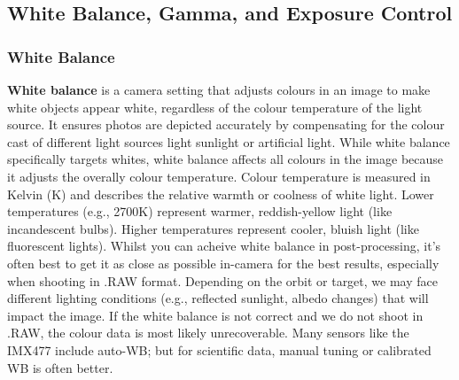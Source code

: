 \documentclass[10pt]{article}
\begin{document}
\begin{multicols}{2}
\subsection{White Balance, Gamma, and Exposure Control}
\subsubsection{White Balance}
\textbf{White balance} is a camera setting that adjusts colours in an image to make white objects appear white, regardless of the colour temperature of the light source. It ensures photos are depicted accurately by compensating for the colour cast of different light sources light sunlight or artificial light.
While white balance specifically targets whites, white balance affects all colours in the image because it adjusts the overally colour temperature.
\newline \newline
Colour temperature is measured in Kelvin (K) and describes the relative warmth or coolness of white light. Lower temperatures (e.g., 2700K) represent warmer, reddish-yellow light (like incandescent bulbs).
Higher temperatures represent cooler, bluish light (like fluorescent lights).
\newline \newline
Whilst you can acheive white balance in post-processing, it's often best to get it as close as possible in-camera for the best results, especially when shooting in .RAW format.
\newline \newline
Depending on the orbit or target, we may face different lighting conditions (e.g., reflected sunlight, albedo changes) that will impact the image. If the white balance is not correct and we do not shoot in .RAW, the colour data is most likely unrecoverable. Many sensors like the IMX477 include auto-WB; but for scientific data, manual tuning or calibrated WB is often better.


\end{multicols}
\end{document}
